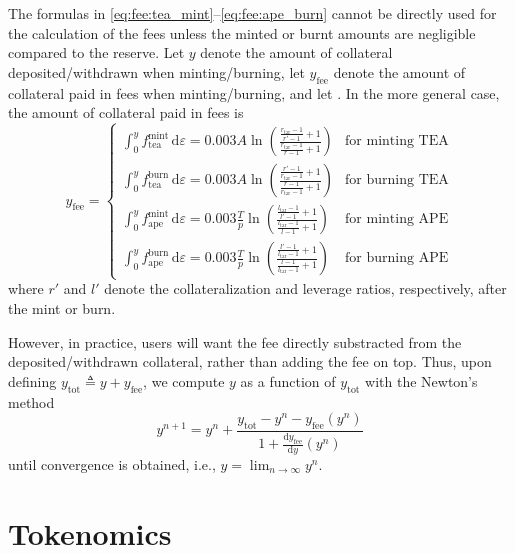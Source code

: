 \documentclass[journal,letterpaper,oneside,onecolumn,12pt]{IEEEtran}
\begin{document}
	The formulas in \eqref{eq:fee:tea_mint}--\eqref{eq:fee:ape_burn} cannot be directly used for the calculation of the fees unless the minted or burnt amounts are negligible compared to the reserve. Let $y$ denote the amount of collateral deposited/withdrawn when minting/burning, let $y_\textrm{fee}$ denote the amount of collateral paid in fees when minting/burning, and let . In the more general case, the amount of collateral paid in fees is
	\begin{equation}
		y_\textrm{fee} = 
		\begin{cases}
			\int_{0}^{y} f_\textrm{tea}^\textrm{mint} \,\mathrm{d}\varepsilon = 0.003 A \ln\left(\frac{\frac{r_\textrm{tar}-1}{r'-1} +1}{\frac{r_\textrm{tar}-1}{r-1}+1}\right)	& \text{for minting TEA} \\
			\int_{0}^{y} f_\textrm{tea}^\textrm{burn} \,\mathrm{d}\varepsilon = 0.003 A \ln\left(\frac{\frac{r'-1}{r_\textrm{tar}-1}+1}{\frac{r-1}{r_\textrm{tar}-1} +1}\right)	& \text{for burning TEA} \\
			\int_{0}^{y} f_\textrm{ape}^\textrm{mint} \,\mathrm{d}\varepsilon = 0.003\frac{T}{p} \ln\left(\frac{\frac{l_\textrm{tar}-1}{l'-1} +1}{\frac{l_\textrm{tar}-1}{l-1}+1}\right)	& \text{for minting APE} \\
			\int_{0}^{y} f_\textrm{ape}^\textrm{burn} \,\mathrm{d}\varepsilon = 0.003\frac{T}{p} \ln\left(\frac{\frac{l'-1}{l_\textrm{tar}-1}+1}{\frac{l-1}{l_\textrm{tar}-1} +1}\right)	& \text{for burning APE}
		\end{cases}
	\end{equation}
	where $r'$ and $l'$ denote the collateralization and leverage ratios, respectively, after the mint or burn. 
	
	However, in practice, users will want the fee directly substracted from the deposited/withdrawn collateral, rather than adding the fee on top. Thus, upon defining $y_\textrm{tot} \triangleq y+y_\textrm{fee}$, we compute $y$ as a function of $y_\textrm{tot}$ with the Newton's method
	\begin{equation}
		y^{n+1} = y^{n} +\frac{y_\textrm{tot} -y^{n} - y_\textrm{fee}(y^{n})}{1+ \frac{\mathrm{d}y_\textrm{fee}}{\mathrm{d}y}(y^{n})}
	\end{equation}
	until convergence is obtained, i.e., $y=\lim_{n\rightarrow\infty}y^{n}$.
	 
	
	

	
	
	
	\section{Tokenomics}
	
\end{document}
